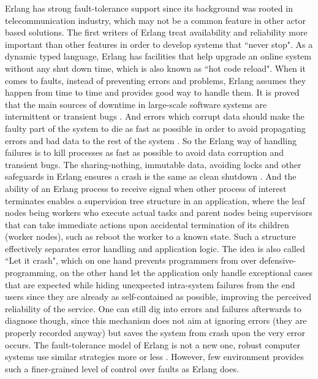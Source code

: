 Erlang has strong fault-tolerance support since its background was rooted in telecommunication industry, which may not be a common feature in other actor based solutions. The first writers of Erlang treat availability and reliability more important than other features in order to develop systems that ``never stop". As a dynamic typed language, Erlang has facilities that help upgrade an online system without any shut down time, which is also known as ``hot code reload". When it comes to faults, instead of preventing errors and problems, Erlang assumes they happen from time to time and provides good way to handle them. It is proved that the main sources of downtime in large-scale software systems are intermittent or transient bugs \autocite{candea2003crash}. And errors which corrupt data should make the faulty part of the system to die as fast as possible in order to avoid propagating errors and bad data to the rest of the system \autocite{learn_you_some_erlang}. So the Erlang way of handling failures is to kill processes as fast as possible to avoid data corruption and transient bugs. The sharing-nothing, immutable data, avoiding locks and other safeguards in Erlang ensures a crash is the same as clean shutdown \autocite{learn_you_some_erlang}. And the ability of an Erlang process to receive signal when other process of interest terminates enables a supervision tree structure in an application, where the leaf nodes being workers who execute actual tasks and parent nodes being supervisors that can take immediate actions upon accidental termination of its children (worker nodes), such as reboot the worker to a known state. Such a structure effectively separates error handling and application logic. The idea is also called ``Let it crash",  which on one hand prevents programmers from over defensive-programming, on the other hand let the application only handle exceptional cases that are expected while hiding unexpected intra-system failures from the end users since they are already as self-contained as possible, improving the perceived reliability of the service. One can still dig into errors and failures afterwards to diagnose though, since this mechanism does not aim at ignoring errors (they are properly recorded anyway) but saves the system from crash upon the very error occurs. The fault-tolerance model of Erlang is not a new one, robust computer systems use similar strategies more or less \autocite{gray1986computers}. However, few environment provides such a finer-grained level of control over faults as Erlang does.

